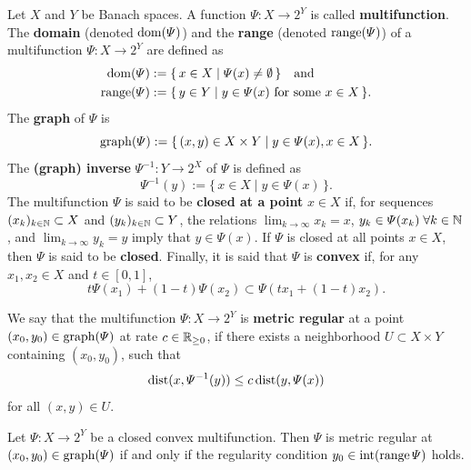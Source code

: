 \begin{definition}[Multifunction]
    Let $X$ and $Y$ be Banach spaces. A function $\varPsi\colon X\to 2^Y$
    is called \textbf{multifunction}. The \textbf{domain} (denoted $\operatorname{dom}(\varPsi)$) and the \textbf{range}
    (denoted $\operatorname{range}(\varPsi)$)
    of a multifunction $\varPsi\colon X\to 2^Y$ are defined as
    \begin{align*}
        \operatorname{dom}(\varPsi) &:= \{\, x\in X \mid \varPsi(x) \neq \emptyset \,\} \quad\text{and} \\
        \operatorname{range}(\varPsi) &:= \{\, y\in Y \mid y\in \varPsi(x) \text{ for some $x\in X$} \,\}.
    \end{align*}
    The \textbf{graph} of $\varPsi$ is
    \[
        \operatorname{graph}(\varPsi) := \{\, (x, y) \in X\times Y \mid y\in\varPsi(x), x\in X \,\}.
    \]
    The \textbf{(graph) inverse} $\varPsi^{-1}\colon Y \to 2^X$ of $\varPsi$ is defined as
    \[
        \varPsi^{-1}(y) := \{\, x\in X \mid y\in\varPsi(x) \,\}.
    \]
    The multifunction $\varPsi$ is said to be \textbf{closed at a point} $x\in X$ if,
    for sequences $(x_k)_{k\in\mathbb{N}} \subset X$ and $(y_k)_{k\in\mathbb{N}} \subset Y$, the relations
    $\lim_{k\to\infty} x_k = x$, $y_k\in \varPsi(x_k) \; \forall k\in\mathbb{N}$, and $\lim_{k\to\infty} y_k = y$ imply that $y\in\varPsi(x)$.
    If $\varPsi$ is closed at all points $x\in X$, then $\varPsi$ is said to be \textbf{closed}.
    Finally, it is said that $\varPsi$ is \textbf{convex} if, for any $x_1,x_2\in X$ and
    $t\in [0, 1]$,
    \[
        t \varPsi(x_1) + (1 - t) \varPsi(x_2) \subset \varPsi(t x_1 + (1 - t) x_2).
    \]
\end{definition}
\begin{definition}
    We say that the multifunction $\varPsi\colon X\to 2^Y$ is \textbf{metric regular} at a point
    $(x_0,y_0)\in\operatorname{graph}(\varPsi)$ at rate $c\in\mathbb{R}_{\geq 0}$, if there
    exists a neighborhood $U\subset X\times Y$ containing $(x_0,y_0)$, such that
    \[
        \operatorname{dist}(x, \varPsi^{-1}(y)) \leq c \operatorname{dist}(y, \varPsi(x))
    \]
    for all $(x, y)\in U$.
\end{definition}
\begin{proposition}
    \label{prop:robinson-ursescu}
    Let $\varPsi\colon X\to 2^Y$ be a closed convex multifunction. Then $\varPsi$
    is metric regular at $(x_0, y_0) \in \operatorname{graph}(\varPsi)$ if and only if the regularity
    condition $y_0 \in \operatorname{int} (\operatorname{range} \varPsi)$ holds.
\end{proposition}
